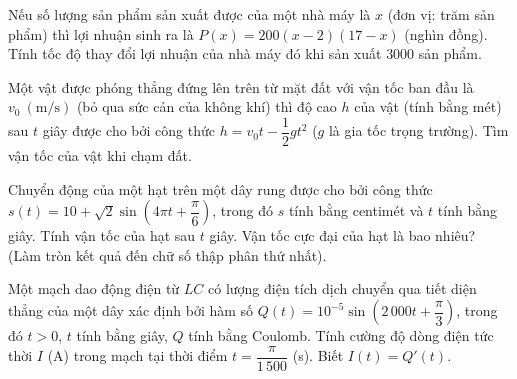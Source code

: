 \begin{baitap}%
	Nếu số lượng sản phẩm sản xuất được của một nhà máy là $x$ (đơn vị: trăm sản phẩm) thì lợi nhuận sinh ra là $P(x)=200\left(x-2\right)\left(17-x\right)$ (nghìn đồng). Tính tốc độ thay đổi lợi nhuận của nhà máy đó khi sản xuất $3000$ sản phẩm.
\end{baitap}

	\begin{baitap}%
	Một vật được phóng thẳng đứng lên trên từ mặt đất với vận tốc ban đầu là $v_0~(\mathrm{m} / \mathrm{s})$ (bỏ qua sức cản của không khí) thì độ cao $h$ của vật (tính bằng mét) sau $t$ giây được cho bởi công thức $h=v_0 t-\dfrac{1}{2} g t^2$ ($g$ là gia tốc trọng trường). Tìm vận tốc của vật khi chạm đất.
\end{baitap}

\begin{baitap}%
	Chuyển động của một hạt trên một dây rung được cho bởi công thức $s(t)=10+\sqrt{2} \sin \left(4 \pi t+\dfrac{\pi}{6}\right)$, trong đó $s$ tính bằng centimét và $t$ tính bằng giây. Tính vận tốc của hạt sau $t$ giây. Vận tốc cực đại của hạt là bao nhiêu? (Làm tròn kết quả đến chữ số thập phân thứ nhất).
\end{baitap}

\begin{baitap}%
	Một mạch dao động điện từ $LC$ có lượng điện tích dịch chuyển qua tiết diện thẳng của một dây xác định bởi hàm số $Q(t)=10^{-5}\sin \left(2\,000t+\dfrac{\pi}{3}\right)$, trong đó $t>0$, $t$ tính bằng giây, $Q$ tính bằng Coulomb. Tính cường độ dòng điện tức thời $I$ (A) trong mạch tại thời điểm $t=\dfrac{\pi}{1\,500}$ (s). Biết $I(t)=Q'(t)$.
\end{baitap}

